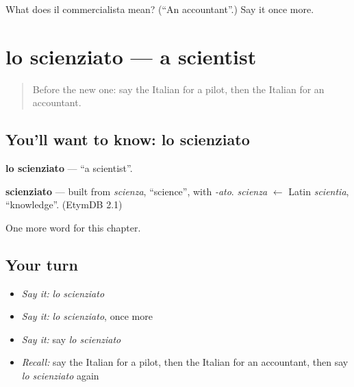 \begin{tcolorbox}[breakable,colback=teal!4,colframe=teal!35!black,title={Before you move on}]
What does il commercialista mean? (\textquotedblleft{}An accountant\textquotedblright{}.) Say it once more.
\end{tcolorbox}
\section[lo scienziato]{lo scienziato — a scientist}

\label{lesson:IT-C195-scienziato}



\begin{quote}
Before the new one: say the Italian for a pilot, then the Italian for an accountant.
\end{quote}

\subsection*{You'll want to know: lo scienziato}
\textbf{lo scienziato} — \textquotedblleft{}a scientist\textquotedblright{}.

\begin{cousinweb}
\textbf{scienziato} — built from \emph{scienza}, \textquotedblleft{}science\textquotedblright{}, with \emph{-ato}. \emph{scienza} $\leftarrow$ Latin \emph{scientia}, \textquotedblleft{}knowledge\textquotedblright{}. (EtymDB 2.1)
\end{cousinweb}

\begin{grammarlens}[title={What you've built}]
One more word for this chapter.
\end{grammarlens}

\subsection*{Your turn}
\begin{itemize}
\raggedright
  \item \emph{Say it:} \emph{lo scienziato}
  \item \emph{Say it:} \emph{lo scienziato}, once more
  \item \emph{Say it:} say \emph{lo scienziato}
  \item \emph{Recall:} say the Italian for a pilot, then the Italian for an accountant, then say \emph{lo scienziato} again
\end{itemize}

